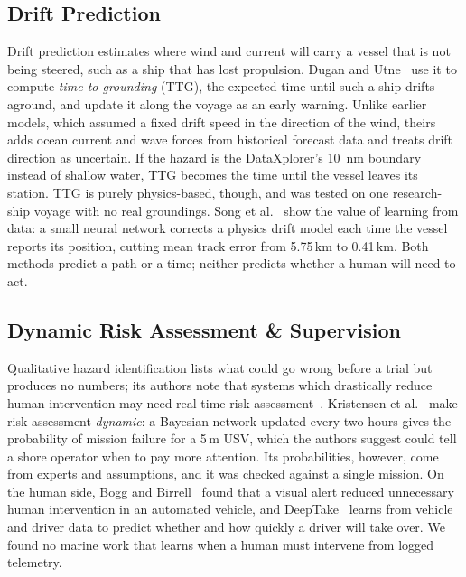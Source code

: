 \documentclass[sigconf]{acmart}
\begin{document}
\subsection{Drift Prediction}
\label{sec:drift}

{Drift prediction estimates where wind and current will carry a vessel that is not being steered, such as a ship that has lost propulsion. Dugan and Utne~\cite{dugan2024drifting} use it to compute \emph{time to grounding} (TTG), the expected time until such a ship drifts aground, and update it along the voyage as an early warning. Unlike earlier models, which assumed a fixed drift speed in the direction of the wind, theirs adds ocean current and wave forces from historical forecast data and treats drift direction as uncertain. If the hazard is the DataXplorer's 10~nm boundary instead of shallow water, TTG becomes the time until the vessel leaves its station. TTG is purely physics-based, though, and was tested on one research-ship voyage with no real groundings. Song et al.~\cite{song2024drift} show the value of learning from data: a small neural network corrects a physics drift model each time the vessel reports its position, cutting mean track error from 5.75\,km to 0.41\,km. Both methods predict a path or a time; neither predicts whether a human will need to act.}


\subsection{Dynamic Risk Assessment \& Supervision}
\label{sec:risk}

Qualitative hazard identification lists what could go wrong before a trial but produces no numbers; its authors note that systems which drastically reduce human intervention may need real-time risk assessment~\cite{na2025qualitative}. Kristensen et al.~\cite{kristensen2022dynamic} make risk assessment \emph{dynamic}: a Bayesian network updated every two hours gives the probability of mission failure for a 5\,m USV, which the authors suggest could tell a shore operator when to pay more attention. Its probabilities, however, come from experts and assumptions, and it was checked against a single mission. On the human side, Bogg and Birrell~\cite{bogg2026alert} found that a visual alert reduced unnecessary human intervention in an automated vehicle, and DeepTake~\cite{pakdamanian2021deeptake} learns from vehicle and driver data to predict whether and how quickly a driver will take over. We found no marine work that learns when a human must intervene from logged telemetry.
\end{document}
